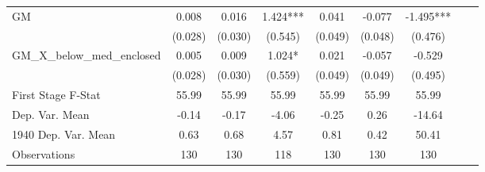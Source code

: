 \begin{tabular}{l*{8}{c}}
\cmidrule(lr){1-7}
GM              &    0.008   &    0.016   &    1.424***&    0.041   &   -0.077   &   -1.495***\\
                &  (0.028)   &  (0.030)   &  (0.545)   &  (0.049)   &  (0.048)   &  (0.476)   \\
\addlinespace
GM\_X\_below\_med\_enclosed&    0.005   &    0.009   &    1.024*  &    0.021   &   -0.057   &   -0.529   \\
                &  (0.028)   &  (0.030)   &  (0.559)   &  (0.049)   &  (0.049)   &  (0.495)   \\
\midrule
First Stage F-Stat&    55.99   &    55.99   &    55.99   &    55.99   &    55.99   &    55.99   \\
Dep. Var. Mean  &    -0.14   &    -0.17   &    -4.06   &    -0.25   &     0.26   &   -14.64   \\
1940 Dep. Var. Mean&     0.63   &     0.68   &     4.57   &     0.81   &     0.42   &    50.41   \\
Observations    &      130   &      130   &      118   &      130   &      130   &      130   \\
 \bottomrule \end{tabular}
